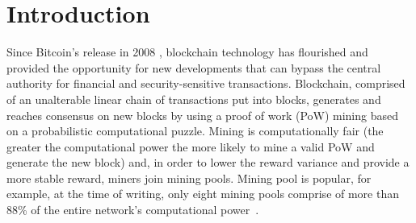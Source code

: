 \section{Introduction}

Since Bitcoin's release in 2008 \cite{b1}, blockchain technology has %
flourished and provided the opportunity for new developments that can bypass the central authority for financial and security-sensitive transactions. %
Blockchain, comprised of an unalterable linear chain of transactions put into blocks,
generates and reaches consensus on new blocks by using a proof of work (PoW) mining
based on a probabilistic computational puzzle.
Mining is computationally fair (the greater the computational power the more likely to mine a valid PoW and generate the new block)
and, in order to lower the reward variance and provide a more stable reward,
miners join mining pools.
Mining pool is popular, for example, at the time of writing, only eight mining pools comprise of more than 88\% of the entire network's computational power~\cite{b12}.
